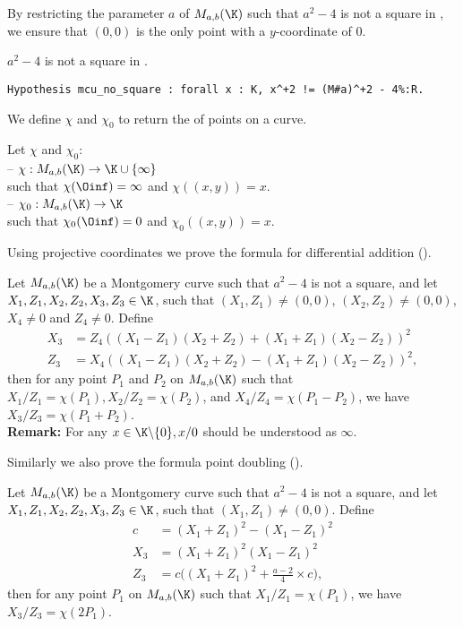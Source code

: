 By restricting the parameter $a$ of $M_{a,b}(\K)$ such that $a^2-4$ is not a
square in \K, we ensure that $(0,0)$ is the only point with a $y$-coordinate of $0$.
\begin{hypothesis}
\label{hyp:a_minus_4_not_square}
$a^2-4$ is not a square in \K.
\end{hypothesis}
\begin{lstlisting}[language=Coq]
Hypothesis mcu_no_square : forall x : K, x^+2 != (M#a)^+2 - 4%:R.
\end{lstlisting}

We define $\chi$ and $\chi_0$ to return the \xcoord of points on a curve.
\begin{dfn}Let $\chi$ and $\chi_0$:\\
-- $\chi : M_{a,b}(\K) \to \K \cup \{\infty\}$\\
  such that $\chi(\Oinf) = \infty$ and $\chi((x,y)) = x$.\\
-- $\chi_0 : M_{a,b}(\K) \to \K$\\
  such that $\chi_0(\Oinf) = 0$ and $\chi_0((x,y)) = x$.
\end{dfn}
Using projective coordinates we prove the formula for differential addition ().
\begin{lemma}
\label{lemma:xADD}
Let $M_{a,b}(\K)$ be a Montgomery curve such that $a^2-4$ is not a square, and
let $X_1, Z_1, X_2, Z_2, X_3, Z_3 \in \K$, such that $(X_1,Z_1) \neq (0,0)$,
$(X_2,Z_2) \neq (0,0)$, $X_4 \neq 0$ and $Z_4 \neq 0$.
Define
\begin{align*}
X_3 &= Z_4((X_1 - Z_1)(X_2+Z_2) + (X_1+Z_1)(X_2-Z_2))^2\\
Z_3 &= X_4((X_1 - Z_1)(X_2+Z_2) - (X_1+Z_1)(X_2-Z_2))^2,
\end{align*}
then for any point $P_1$ and $P_2$ on $M_{a,b}(\K)$ such that
$X_1/Z_1 = \chi(P_1), X_2/Z_2 = \chi(P_2)$, and $X_4/Z_4 = \chi(P_1 - P_2)$,
we have $X_3/Z_3 = \chi(P_1+P_2)$.\\
\textbf{Remark:} For any $x \in \K \backslash\{0\}, x/0$ should be understood as $\infty$.
\end{lemma}
Similarly we also prove the formula point doubling ().
\begin{lemma}
\label{lemma:xDBL}
Let $M_{a,b}(\K)$ be a Montgomery curve such that $a^2-4$ is not a square, and
let $X_1, Z_1, X_2, Z_2, X_3, Z_3 \in \K$, such that $(X_1,Z_1) \neq (0,0)$. Define
\begin{align*}
  c &= (X_1 + Z_1)^2 - (X_1 - Z_1)^2\\
X_3 &= (X_1 + Z_1)^2(X_1-Z_1)^2\\
Z_3 &= c\Big((X_1 + Z_1)^2+\frac{a-2}{4}\times c\Big),
\end{align*}
then for any point $P_1$ on $M_{a,b}(\K)$ such that $X_1/Z_1 = \chi(P_1)$,
we have $X_3/Z_3 = \chi(2P_1)$.
\end{lemma}

